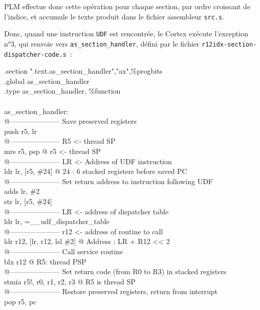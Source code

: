 PLM effectue donc cette opération pour chaque section, par ordre croissant de l'indice, et accumule le texte produit dans le fichier assembleur \texttt{src.s}.

Donc, quand une instruction \texttt{UDF} est rencontrée, le Cortex exécute l'exception n°3, qui renvoie vers \texttt{as\_section\_handler}, défini par le fichier \texttt{r12idx-section-dispatcher-code.s}~:

\begin{SHELL}\small
\hspace*{1.2em}.section	".text.as\_section\_handler","ax",\%progbits\\
\hspace*{1.2em}.global as\_section\_handler\\
\hspace*{1.2em}.type as\_section\_handler, \%function\\
\\
as\_section\_handler:\\
@--------------------- Save preserved registers\\
\hspace*{1.2em}push  {r5, lr}\\
@--------------------- R5 <- thread SP\\
\hspace*{1.2em}mrs   r5, psp           @ r5 <- thread SP\\
@--------------------- LR <- Address of UDF instruction\\
\hspace*{1.2em}ldr   lr, [r5, \#24]     @ 24 : 6 stacked registers before saved PC\\
@--------------------- Set return address to instruction following UDF\\
\hspace*{1.2em}adds  lr, \#2\\
\hspace*{1.2em}str   lr, [r5, \#24]\\
@--------------------- LR <- address of dispatcher table\\
\hspace*{1.2em}ldr   lr, =\_\_udf\_dispatcher\_table\\
@--------------------- r12 <- address of routine to call\\
\hspace*{1.2em}ldr   r12, [lr, r12, lsl \#2]   @ Address : LR + R12 << 2\\
@--------------------- Call service routine\\
\hspace*{1.2em}blx   r12                      @ R5: thread PSP\\
@--------------------- Set return code (from R0 to R3) in stacked registers\\
\hspace*{1.2em}stmia r5!, {r0, r1, r2, r3}    @ R5 is thread SP\\
@--------------------- Restore preserved registers, return from interrupt\\
\hspace*{1.2em}pop   {r5, pc}
\end{SHELL}

